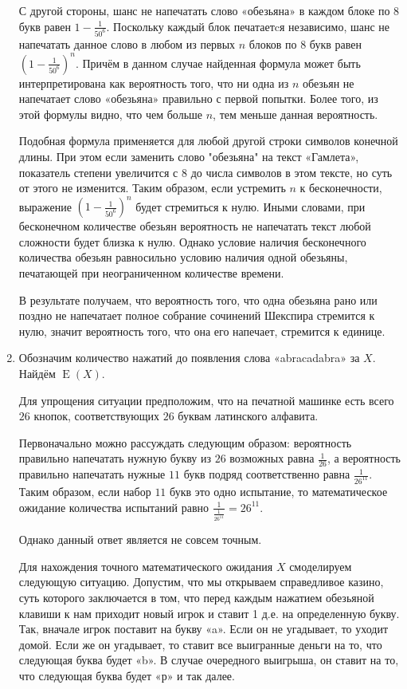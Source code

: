 \documentclass[nobib]{tufte-handout}
\theoremstyle{definition}
\newcounter{problem}
\newenvironment{problem}%
{%
\refstepcounter{problem}%
     \hypertarget{problem:{\theproblem}}{}
     \Writetofile{solution_file}{\protect\hypertarget{soln:\theproblem}{}}
     \begin{myenum}[label=\bfseries\protect\hyperlink{soln:\theproblem}{\theproblem},ref=\theproblem]
     \item%
    }%
    {%
    \end{myenum}}
\DeclareMathOperator{\E}{E}
\begin{document}
\begin{problem}
\begin{sol}
\begin{enumerate}
С другой стороны, шанс не напечатать слово «обезьяна» в каждом блоке по $8$ букв равен $1 - \frac{1}{50^6}$. Поскольку каждый блок печатаетcя независимо, шанс не напечатать данное слово в любом из первых $n$ блоков по $8$ букв равен $\left(1 - \frac{1}{50^6}\right)^n$. Причём в данном случае найденная формула может быть интерпретирована как вероятность того, что ни одна из $n$ обезьян не напечатает слово «обезьяна» правильно с первой попытки. Более того, из этой формулы видно, что чем больше $n$, тем меньше данная вероятность.

Подобная формула применяется для любой другой строки символов конечной длины. При этом если заменить слово "обезьяна" на текст «Гамлета», показатель степени увеличится с $8$ до числа символов в этом тексте, но суть от этого не изменится. Таким образом, если устремить $n$ к бесконечности, выражение $\left(1 - \frac{1}{50^6}\right)^n$ будет стремиться к нулю. Иными словами, при бесконечном количестве обезьян вероятность не напечатать текст любой сложности будет близка к нулю. Однако условие наличия бесконечного количества обезьян равносильно условию наличия одной обезьяны, печатающей при неограниченном количестве времени.

В результате получаем, что вероятность того, что одна обезьяна рано или поздно не напечатает полное собрание сочинений Шекспира стремится к нулю, значит вероятность того, что она его напечает, стремится к единице.

\item Обозначим количество нажатий до появления слова «abracadabra» за $X$. Найдём $\E(X)$.


Для упрощения ситуации предположим, что на печатной машинке есть всего $26$ кнопок, соответствующих $26$ буквам латинского алфавита.

Первоначально можно рассуждать следующим образом: вероятность правильно напечатать нужную букву из $26$ возможных равна $\frac{1}{26}$, а вероятность правильно напечатать нужные $11$ букв подряд соответственно равна $\frac{1}{26^{11}}$. Таким образом, если набор $11$ букв это одно испытание, то математическое ожидание количества испытаний равно $\frac{1}{\frac{1}{26^{11}}} = 26^{11}$.

Однако данный ответ является не совсем точным.

Для нахождения точного математического ожидания $X$ смоделируем следующую ситуацию. Допустим, что мы открываем справедливое казино, суть которого заключается в том, что перед каждым нажатием обезьяной клавиши к нам приходит новый игрок и ставит 1 д.е. на определенную букву. Так, вначале игрок поставит на букву «a». Если он не угадывает, то уходит домой. Если же он угадывает, то ставит все выигранные деньги на то, что следующая буква будет «b». В случае очередного выигрыша, он ставит на то, что следующая буква будет «р» и так далее.


\end{enumerate}
\end{sol}
\end{problem}
\end{document}
